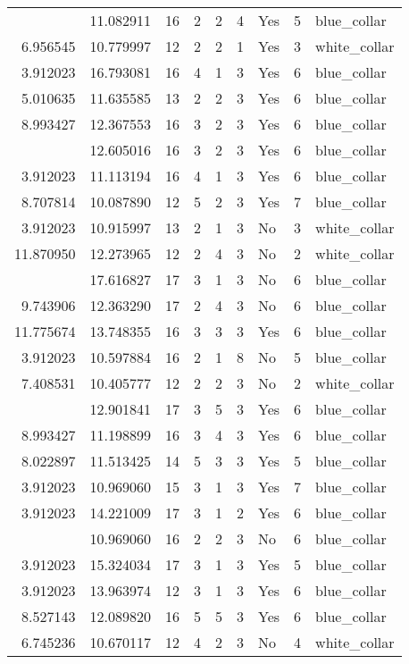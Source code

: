 \documentclass[
]{article}
\begin{document}
\begin{longtable}[t]{rrrrrllrl}
\addlinespace
7.843849 & 11.082911 & 16 & 2 & 2 & 4 & Yes & 5 & blue\_collar\\
6.956545 & 10.779997 & 12 & 2 & 2 & 1 & Yes & 3 & white\_collar\\
3.912023 & 16.793081 & 16 & 4 & 1 & 3 & Yes & 6 & blue\_collar\\
5.010635 & 11.635585 & 13 & 2 & 2 & 3 & Yes & 6 & blue\_collar\\
8.993427 & 12.367553 & 16 & 3 & 2 & 3 & Yes & 6 & blue\_collar\\
\addlinespace
8.527143 & 12.605016 & 16 & 3 & 2 & 3 & Yes & 6 & blue\_collar\\
3.912023 & 11.113194 & 16 & 4 & 1 & 3 & Yes & 6 & blue\_collar\\
8.707814 & 10.087890 & 12 & 5 & 2 & 3 & Yes & 7 & blue\_collar\\
3.912023 & 10.915997 & 13 & 2 & 1 & 3 & No & 3 & white\_collar\\
11.870950 & 12.273965 & 12 & 2 & 4 & 3 & No & 2 & white\_collar\\
\addlinespace
3.912023 & 17.616827 & 17 & 3 & 1 & 3 & No & 6 & blue\_collar\\
9.743906 & 12.363290 & 17 & 2 & 4 & 3 & No & 6 & blue\_collar\\
11.775674 & 13.748355 & 16 & 3 & 3 & 3 & Yes & 6 & blue\_collar\\
3.912023 & 10.597884 & 16 & 2 & 1 & 8 & No & 5 & blue\_collar\\
7.408531 & 10.405777 & 12 & 2 & 2 & 3 & No & 2 & white\_collar\\
\addlinespace
12.421386 & 12.901841 & 17 & 3 & 5 & 3 & Yes & 6 & blue\_collar\\
8.993427 & 11.198899 & 16 & 3 & 4 & 3 & Yes & 6 & blue\_collar\\
8.022897 & 11.513425 & 14 & 5 & 3 & 3 & Yes & 5 & blue\_collar\\
3.912023 & 10.969060 & 15 & 3 & 1 & 3 & Yes & 7 & blue\_collar\\
3.912023 & 14.221009 & 17 & 3 & 1 & 2 & Yes & 6 & blue\_collar\\
\addlinespace
10.435585 & 10.969060 & 16 & 2 & 2 & 3 & No & 6 & blue\_collar\\
3.912023 & 15.324034 & 17 & 3 & 1 & 3 & Yes & 5 & blue\_collar\\
3.912023 & 13.963974 & 12 & 3 & 1 & 3 & Yes & 6 & blue\_collar\\
8.527143 & 12.089820 & 16 & 5 & 5 & 3 & Yes & 6 & blue\_collar\\
6.745236 & 10.670117 & 12 & 4 & 2 & 3 & No & 4 & white\_collar\\

\end{longtable}
\end{document}
